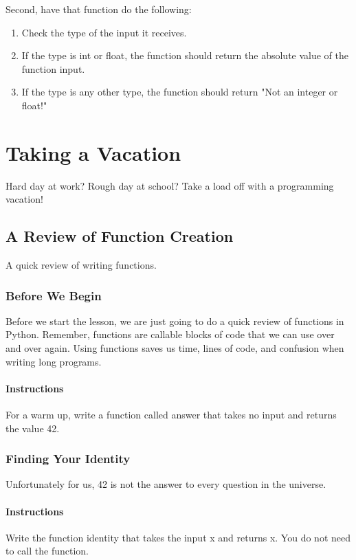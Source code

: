 \documentclass[12pt,a4paper,final,twoside,onecolumn,titlepage]{book}
\begin{document}
Second, have that function do the following:
\begin{enumerate}
\item    Check the type of the input it receives.
\item    If the type is int or float, the function should return the absolute value of the function input.
\item    If the type is any other type, the function should return "Not an integer or float!"
\end{enumerate}

\chapter{Taking a Vacation}
Hard day at work? Rough day at school? Take a load off with a programming vacation!

\section{A Review of Function Creation}
    A quick review of writing functions.
\subsection{Before We Begin}

Before we start the lesson, we are just going to do a quick review of functions in Python. Remember, functions are callable blocks of code that we can use over and over again. Using functions saves us time, lines of code, and confusion when writing long programs.
\subsubsection{Instructions}
For a warm up, write a function called answer that takes no input and returns the value 42.

\subsection{Finding Your Identity}

Unfortunately for us, 42 is not the answer to every question in the universe.
\subsubsection{Instructions}

Write the function identity that takes the input x and returns x. You do not need to call the function.
\end{document}

